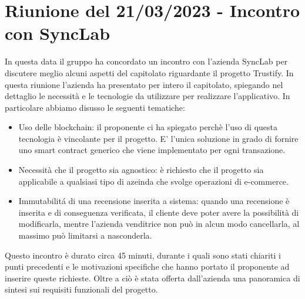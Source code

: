 \documentclass[12pt]{article}
\begin{document}
\section{Riunione del 21/03/2023 - Incontro con SyncLab}
In questa data il gruppo ha concordato un incontro con l'azienda SyncLab per discutere meglio alcuni aspetti del capitolato riguardante il progetto Trustify.
In questa riunione l'azienda ha presentato per intero il capitolato, spiegando nel dettaglio le necessità e le tecnologie da utilizzare per realizzare l'applicativo.
In particolare abbiamo disusso le seguenti tematiche:
\begin{itemize}
    \item Uso delle blockchain: il proponente ci ha spiegato perchè l'uso di questa tecnologia è vincolante per il progetto. E' l'unica soluzione in grado di fornire uno smart contract generico che viene implementato per ogni transazione.
    \item Necessità che il progetto sia agnostico: è richiesto che il progetto sia applicabile a qualsiasi tipo di azeinda che svolge operazioni di e-commerce.
    \item Immutabilit\'{a} di una recensione inserita a sistema: quando una recensione è inserita e di conseguenza verificata, il cliente deve poter avere la possibilità di modificarla, mentre l'azienda venditrice non può in alcun modo cancellarla, al massimo può limitarsi a nasconderla.
\end{itemize}
Questo incontro è durato circa 45 minuti, durante i quali sono stati chiariti i punti precedenti e le motivazioni specifiche che hanno portato il proponente ad inserire queste richieste. Oltre a ciò è stata offerta dall'azienda una panoramica di sintesi sui requisiti funzionali del progetto.
\end{document}
